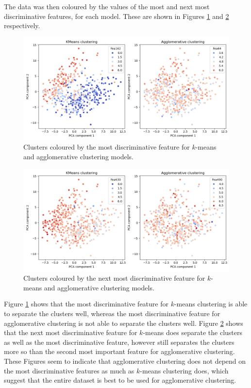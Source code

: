 \documentclass{article}
\begin{document}
\begin{enumerate}[label=\alph*)]
    The data was then coloured by the values of the most and next most discriminative features, for each model. These are shown in Figures \ref{fig:Q5c_top_feature} and \ref{fig:Q5c_next_feature} respectively.
    \begin{figure}[!htb]
        \centering
        \includegraphics[width=\textwidth]{Q5c_KMeans_Agglomerative_PCA_top_feature.png}
        \caption{Clusters coloured by the most discriminative feature for $k$-means and agglomerative clustering models.}
        \label{fig:Q5c_top_feature}
    \end{figure}
    \begin{figure}[!htb]
        \centering
        \includegraphics[width=\textwidth]{Q5c_KMeans_Agglomerative_PCA_second_feature.png}
        \caption{Clusters coloured by the next most discriminative feature for $k$-means and agglomerative clustering models.}
        \label{fig:Q5c_next_feature}
    \end{figure}
    Figure \ref{fig:Q5c_top_feature} shows that the most discriminative feature for $k$-means clustering is able to separate the clusters well, whereas the most discriminative feature for agglomerative clustering is not able to separate the clusters well. Figure \ref{fig:Q5c_next_feature} shows that the next most discriminative feature for $k$-means does separate the clusters as well as the most discriminative feature, however still separates the clusters more so than the second most important feature for agglomerative clustering. These Figures seem to indicate that agglomerative clustering does not depend on the most discriminative features as much as $k$-means clustering does, which suggest that the entire dataset is best to be used for agglomerative clustering.
\end{enumerate}
\end{document}
